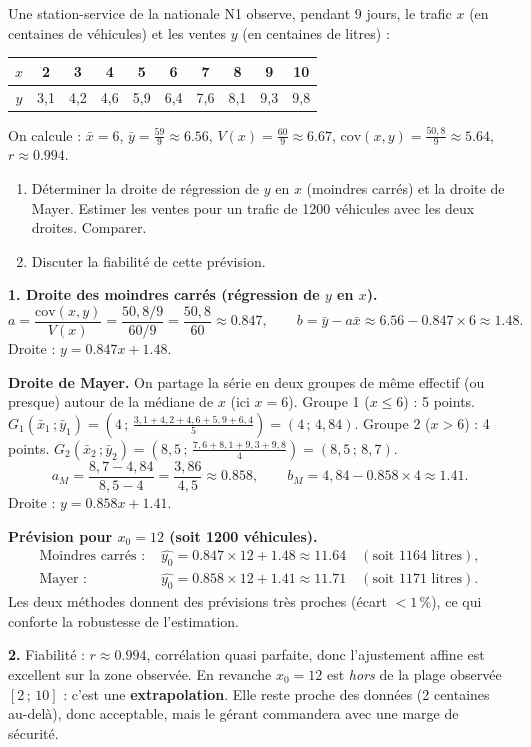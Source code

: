 \documentclass[11pt]{article}
\begin{document}
\begin{exoresolu}
Une station-service de la nationale N1 observe, pendant 9 jours, le trafic $x$ (en centaines de véhicules) et les ventes $y$ (en centaines de litres) :
\begin{center}
\begin{tabular}{|c|*{9}{c|}}
\hline
\rowcolor{popblueL}
$x$ & 2 & 3 & 4 & 5 & 6 & 7 & 8 & 9 & 10 \\
\hline
$y$ & 3,1 & 4,2 & 4,6 & 5,9 & 6,4 & 7,6 & 8,1 & 9,3 & 9,8 \\
\hline
\end{tabular}
\end{center}
On calcule : $\bar{x} = 6$, $\bar{y} = \frac{59}{9} \approx \num{6,56}$, $V(x) = \frac{60}{9} \approx \num{6,67}$, $\mathrm{cov}(x,y) = \frac{50,8}{9} \approx \num{5,64}$, $r \approx \num{0,994}$.
\begin{enumerate}
\item Déterminer la droite de régression de $y$ en $x$ (moindres carrés) et la droite de Mayer. Estimer les ventes pour un trafic de \num{1200} véhicules avec les deux droites. Comparer.
\item Discuter la fiabilité de cette prévision.
\end{enumerate}
\tcblower
\textbf{1. Droite des moindres carrés (régression de $y$ en $x$).}
\[ a = \frac{\mathrm{cov}(x,y)}{V(x)} = \frac{50,8/9}{60/9} = \frac{50,8}{60} \approx \num{0,847}, \qquad b = \bar{y} - a\bar{x} \approx \num{6,56} - \num{0,847}\times 6 \approx \num{1,48}. \]
Droite : $y = \num{0,847}x + \num{1,48}$.

\textbf{Droite de Mayer.} On partage la série en deux groupes de même effectif (ou presque) autour de la médiane de $x$ (ici $x=6$).
Groupe 1 ($x \le 6$) : 5 points. $G_1(\bar{x}_1\,;\bar{y}_1) = (4\,;\, \frac{3,1+4,2+4,6+5,9+6,4}{5}) = (4\,;\, 4,84)$.
Groupe 2 ($x > 6$) : 4 points. $G_2(\bar{x}_2\,;\bar{y}_2) = (8,5\,;\, \frac{7,6+8,1+9,3+9,8}{4}) = (8,5\,;\, 8,7)$.
\[ a_M = \frac{8,7 - 4,84}{8,5 - 4} = \frac{3,86}{4,5} \approx \num{0,858}, \qquad b_M = 4,84 - \num{0,858}\times 4 \approx \num{1,41}. \]
Droite : $y = \num{0,858}x + \num{1,41}$.

\textbf{Prévision pour $x_0 = 12$ (soit \num{1200} véhicules).}
\begin{align*}
\text{Moindres carrés : } & \widehat{y_0} = \num{0,847}\times 12 + \num{1,48} \approx \num{11,64} \quad (\text{soit } \num{1164} \text{ litres}), \\
\text{Mayer : } & \widehat{y_0} = \num{0,858}\times 12 + \num{1,41} \approx \num{11,71} \quad (\text{soit } \num{1171} \text{ litres}).
\end{align*}
Les deux méthodes donnent des prévisions très proches (écart $< 1\,\%$), ce qui conforte la robustesse de l'estimation.

\textbf{2.} Fiabilité : $r \approx \num{0,994}$, corrélation quasi parfaite, donc l'ajustement affine est excellent sur la zone observée. En revanche $x_0 = 12$ est \emph{hors} de la plage observée $[2\,;\,10]$ : c'est une \textbf{extrapolation}. Elle reste proche des données (2 centaines au-delà), donc acceptable, mais le gérant commandera avec une marge de sécurité.
\end{exoresolu}
\end{document}
